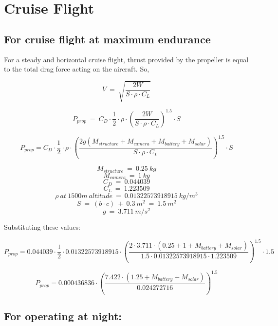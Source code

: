 \chapter{Cruise Flight}
\label{chap: Cruise Flight}

\section{For cruise flight at maximum endurance}

\p For a steady and horizontal cruise flight, thrust provided by the propeller is equal to the total drag force acting on the aircraft. So,



\[
V \ = \ \sqrt{\frac{2W}{S \cdot \rho \cdot C_L }}
\]

\[
P_{prop} \ = \  C_D \cdot \frac{1}{2} \cdot \rho \cdot \left(\frac{2W}{S \cdot \rho \cdot C_L }\right)^{1.5} \cdot S
\]



\[
P_{prop} = C_D \cdot \frac{1}{2} \cdot \rho \cdot \left(\frac{2g(M_{structure} + M_{camera} + M_{battery} + M_{solar})}{S \cdot \rho \cdot C_L} \right)^{1.5} \cdot S
\]

\[ M_{structure} \ = \ 0.25 \ kg \]
\[ M_{camera} \ = \ 1 \ kg \]
\[ C_D \ = \ 0.044039 \]
\[ C_L \ = \ 1.223509 \]
\[ \rho \ at \ 1500m \ altitude \ = \ 0.01322573918915 \ kg/m^3 \]
\[S \ = \ ( b \cdot c ) \ + \ 0.3 \ m^2 \ = \ 1.5 \ m^2\]
\[g \ = \ 3.711 \ m/s^2 \]

Substituting these values:

\[
P_{prop} = 0.044039 \cdot \frac{1}{2} \cdot 0.01322573918915 \cdot \left(\frac{2 \cdot 3.711 \cdot (0.25 + 1 + M_{battery} + M_{solar})}{1.5 \cdot 0.01322573918915 \cdot 1.223509} \right)^{1.5} \cdot 1.5
\]


\[
P_{prop} = 0.000436836 \cdot \left(\frac{7.422 \cdot (1.25 + M_{battery} + M_{solar})}{ 0.024272716 } \right)^{1.5}
\]






\section{For operating at night:}

